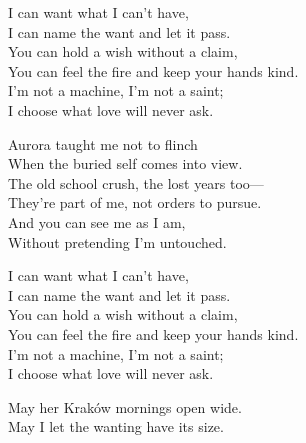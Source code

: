 \begin{lyrics}
I can want what I can’t have,\\
I can name the want and let it pass.\\
You can hold a wish without a claim,\\
You can feel the fire and keep your hands kind.\\
I’m not a machine, I’m not a saint;\\
I choose what love will never ask.

Aurora taught me not to flinch\\
When the buried self comes into view.\\
The old school crush, the lost years too—\\
They’re part of me, not orders to pursue.\\
And you can see me as I am,\\
Without pretending I’m untouched.

I can want what I can’t have,\\
I can name the want and let it pass.\\
You can hold a wish without a claim,\\
You can feel the fire and keep your hands kind.\\
I’m not a machine, I’m not a saint;\\
I choose what love will never ask.

May her Kraków mornings open wide.\\
May I let the wanting have its size.
\end{lyrics}

